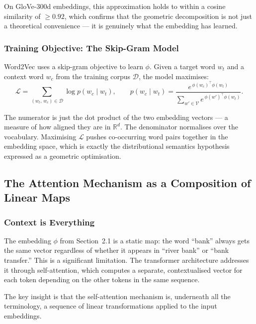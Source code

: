 \documentclass[12pt,a4paper]{article}
\begin{document}
On GloVe-300d embeddings, this approximation holds to within a cosine similarity of
$\geq 0.92$, which confirms that the geometric decomposition is not just a theoretical
convenience --- it is genuinely what the embedding has learned.

\subsubsection{Training Objective: The Skip-Gram Model}

Word2Vec uses a skip-gram objective to learn $\phi$. Given a target word $w_t$ and a
context word $w_c$ from the training corpus $\mathcal{D}$, the model maximises:
\begin{equation}
    \mathcal{L} = \sum_{(w_t,\, w_c) \in \mathcal{D}} \log p(w_c \mid w_t),
    \qquad
    p(w_c \mid w_t)
    = \frac{e^{\,\phi(w_c)^\top \phi(w_t)}}
           {\displaystyle\sum_{w' \in \mathcal{V}} e^{\,\phi(w')^\top \phi(w_t)}}.
\end{equation}

The numerator is just the dot product of the two embedding vectors --- a measure of how
aligned they are in $\mathbb{R}^d$. The denominator normalises over the vocabulary.
Maximising $\mathcal{L}$ pushes co-occurring word pairs together in the embedding space,
which is exactly the distributional semantics hypothesis expressed as a geometric
optimisation.

\subsection{The Attention Mechanism as a Composition of Linear Maps}

\subsubsection{Context is Everything}

The embedding $\phi$ from Section~2.1 is a static map: the word ``bank'' always gets the
same vector regardless of whether it appears in ``river bank'' or ``bank transfer.'' This
is a significant limitation. The transformer architecture addresses it through self-attention,
which computes a separate, contextualised vector for each token depending on the other tokens
in the same sequence.

The key insight is that the self-attention mechanism is, underneath all the terminology,
a sequence of linear transformations applied to the input embeddings.
\end{document}
